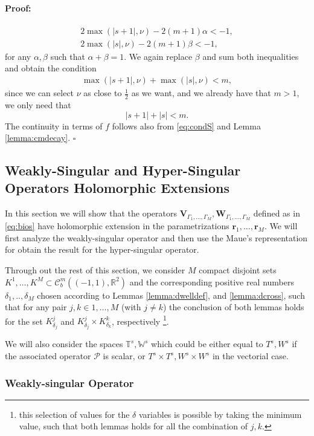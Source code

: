 \documentclass{article}
\newenvironment{proof}{\paragraph{Proof:}}{\hfill$\square$}
\newcommand{\IR}{{\mathbb R}}
\newcommand{\rgeo}[1]{\mathcal{C}_b^{#1}\left( (-1,1), \IR^2 \right)}
\newcommand{\cP}{\mathcal{P}}
\newcommand{\br}{\bm{r}}
\begin{document}
\begin{proof}
\begin{align*}
2 \max(|s+1|, \nu ) - 2(m+1) \alpha < -1, \\ 
2 \max(|s|, \nu ) - 2(m+1) \beta < -1 ,
\end{align*}
for any $\alpha, \beta$ such that $\alpha + \beta =1$. We again replace $\beta$ and sum both inequalities and obtain the condition 
\begin{align*}
\max(|s+1|, \nu ) +\max(|s|, \nu )  < m ,
\end{align*}
since we can select $\nu$ as close to $\frac{1}{2}$ as we want, and we already have that $m > 1$, we only need that 
$$|s+1| + |s| < m. $$
The continuity in terms of $f$ follows also from \eqref{eq:condS} and Lemma   \ref{lemma:cmdecay}. 
\end{proof}


\subsection{Weakly-Singular and Hyper-Singular Operators Holomorphic Extensions}
In this section we will show that the operators $\mathbf{V}_{\Gamma_1,\hdots,\Gamma_M}, \mathbf{W}_{\Gamma_1,\hdots,\Gamma_M}$ defined as in \eqref{eq:bios} have holomorphic extension in the parametrizations $\br_1,\hdots,\br_M$. We will first analyze the weakly-singular operator and then use the Maue's representation for obtain the result for the hyper-singular operator. 

Through out the rest of this section, we consider $M$ compact disjoint sets $K^1,\hdots,K^M \subset \rgeo{m}$ and the corresponding positive real numbers $\delta_1, ..,\delta_M$ chosen according to Lemmas \ref{lemma:dwelldef}, and \ref{lemma:dcross}, such that for any pair $j,k \in 1,\hdots,M$ (with $j\neq k$) the conclusion of both lemmas holds for the set $K^j_{\delta_j}$ and $ K^j_{\delta_j}\times K^k_{\delta_k}$, respectively \footnote{this selection of values for the $\delta$ variables is possible by taking the minimum value, such that both lemmas holds for all the combination of $j,k$. }. 

We will also consider the spaces $\mathbb{T}^s, \mathbb{W}^s$ which could be either equal to $T^s,W^s$ if the associated operator $\cP$ is scalar, or $T^s\times T^s,W^s\times W^s$ in the vectorial case. 


\subsubsection{Weakly-singular Operator}
\end{document}
